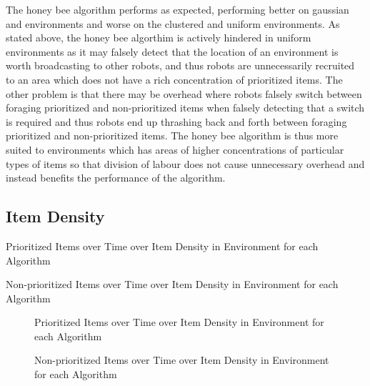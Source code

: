 The honey bee algorithm performs as expected, performing better on gaussian and environments and worse on the clustered and uniform environments. As stated above, the honey bee algorthim is actively hindered in uniform environments as it may falsely detect that the location of an environment is worth broadcasting to other robots, and thus robots are unnecessarily recruited to an area which does not have a rich concentration of prioritized items. The other problem is that there may be overhead where robots falsely switch between foraging prioritized and non-prioritized items when falsely detecting that a switch is required and thus robots end up thrashing back and forth between foraging prioritized and non-prioritized items. The honey bee algorithm is thus more suited to environments which has areas of higher concentrations of particular types of items so that division of labour does not cause unnecessary overhead and instead benefits the performance of the algorithm. 

\subsection{Item Density}
\label{results:itemdensity}

\begin{table} [h]
     \caption{Prioritized Items over Time over Item Density in Environment for each Algorithm}
     \label{itemdensityprioritized}
	\centering
	\footnotesize
	
\end{table}

\begin{table} [h]
     \caption{Non-prioritized Items over Time over Item Density in Environment for each Algorithm}
     \label{itemdensitynonprioritized}
	\centering
	\footnotesize
	
\end{table}


\begin{figure}[!htb]
\centering
\resizebox{\textwidth}{!}{}
\caption{Prioritized Items over Time over Item Density in Environment  for each Algorithm}
\label{objectgoldplot}
\end{figure}


\begin{figure}[!htb]
\centering
\resizebox{\textwidth}{!}{}
\caption{Non-prioritized Items over Time over Item Density in Environment for each Algorithm}
\label{objectwasteplot}
\end{figure}

